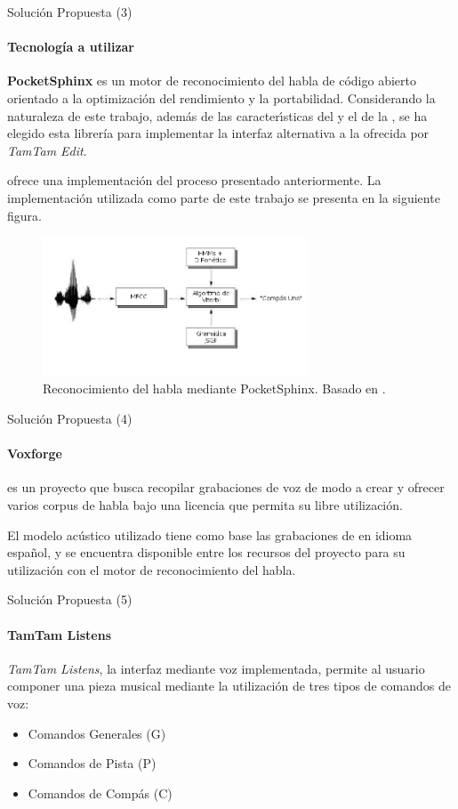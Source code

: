 \begin{frame}{Soluci\'on Propuesta (3)}
\framesubtitle{Tecnolog\'ia a utilizar}
\textbf{PocketSphinx}
es un motor de reconocimiento del habla de c\'odigo abierto orientado a la optimizaci\'on del rendimiento
y la portabilidad. 
Considerando la naturaleza de este trabajo, adem\'as de las caracter{\'\i}sticas del  y el 
 de la , se ha elegido esta librer\'ia para implementar la 
interfaz alternativa a la ofrecida por \emph{TamTam Edit}.

 ofrece una implementaci\'on del proceso presentado anteriormente. La implementaci\'on utilizada
como parte de este trabajo se presenta en la siguiente figura.

\begin{figure}[H] 
\centering
\includegraphics[width=0.7\textwidth]{./graphics/pocketsphinx.png}
\caption{Reconocimiento del habla mediante PocketSphinx. Basado en \cite{VerenichASR}.}
\label{figure:hmm}
\end{figure}
\end{frame}

\begin{frame}{Soluci\'on Propuesta (4)}
\framesubtitle{Voxforge}
\cite{Voxforge} es un proyecto que busca recopilar grabaciones de voz de modo a crear 
y ofrecer varios corpus de habla bajo una licencia que permita su libre utilizaci\'on. 

El modelo ac\'ustico utilizado tiene como base las grabaciones de  en idioma espa\~nol,
y se encuentra disponible entre los recursos del proyecto  para su utilizaci\'on
con el motor de reconocimiento del habla.
\end{frame}

\begin{frame}{Soluci\'on Propuesta (5)}
\framesubtitle{TamTam Listens}
\emph{TamTam Listens}, la interfaz mediante voz implementada, permite al usuario componer una 
pieza musical mediante la utilizaci\'on de tres tipos de comandos de voz:

\begin{itemize}
    \item Comandos Generales (G)
    \item Comandos de Pista (P)
    \item Comandos de Comp\'as (C)
\end{itemize}
 

\end{frame}

